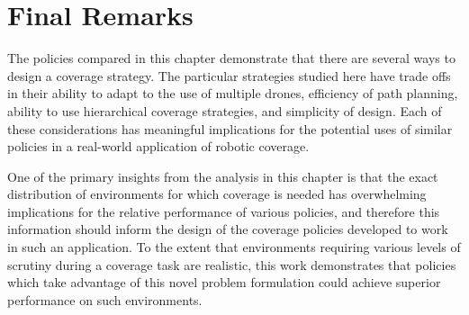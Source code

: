\section{Final Remarks}

The policies compared in this chapter demonstrate that there are several ways to design a coverage strategy. The particular strategies studied here have trade offs in their ability to adapt to the use of multiple drones, efficiency of path planning, ability to use hierarchical coverage strategies, and simplicity of design. Each of these considerations has meaningful implications for the potential uses of similar policies in a real-world application of robotic coverage.

One of the primary insights from the analysis in this chapter is that the exact distribution of environments for which coverage is needed has overwhelming implications for the relative performance of various policies, and therefore this information should inform the design of the coverage policies developed to work in such an application. To the extent that environments requiring various levels of scrutiny during a coverage task are realistic, this work demonstrates that policies which take advantage of this novel problem formulation could achieve superior performance on such environments.